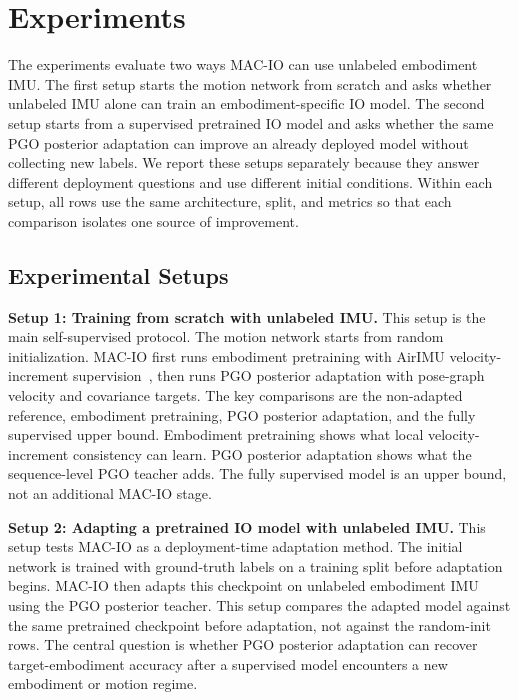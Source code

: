\section{Experiments}
\label{sec:macio:experiments}

The experiments evaluate two ways MAC-IO can use unlabeled embodiment IMU.
The first setup starts the motion network from scratch and asks whether unlabeled IMU alone can train an embodiment-specific IO model.
The second setup starts from a supervised pretrained IO model and asks whether the same PGO posterior adaptation can improve an already deployed model without collecting new labels.
We report these setups separately because they answer different deployment questions and use different initial conditions.
Within each setup, all rows use the same architecture, split, and metrics so that each comparison isolates one source of improvement.

\subsection{Experimental Setups}
\label{sec:macio:protocol}

\textbf{Setup 1: Training from scratch with unlabeled IMU.}
This setup is the main self-supervised protocol.
The motion network starts from random initialization.
MAC-IO first runs embodiment pretraining with AirIMU velocity-increment supervision~\cite{qiu2023airimu}, then runs PGO posterior adaptation with pose-graph velocity and covariance targets.
The key comparisons are the non-adapted reference, embodiment pretraining, PGO posterior adaptation, and the fully supervised upper bound.
Embodiment pretraining shows what local velocity-increment consistency can learn.
PGO posterior adaptation shows what the sequence-level PGO teacher adds.
The fully supervised model is an upper bound, not an additional MAC-IO stage.

\textbf{Setup 2: Adapting a pretrained IO model with unlabeled IMU.}
This setup tests MAC-IO as a deployment-time adaptation method.
The initial network is trained with ground-truth labels on a training split before adaptation begins.
MAC-IO then adapts this checkpoint on unlabeled embodiment IMU using the PGO posterior teacher.
This setup compares the adapted model against the same pretrained checkpoint before adaptation, not against the random-init rows.
The central question is whether PGO posterior adaptation can recover target-embodiment accuracy after a supervised model encounters a new embodiment or motion regime.

